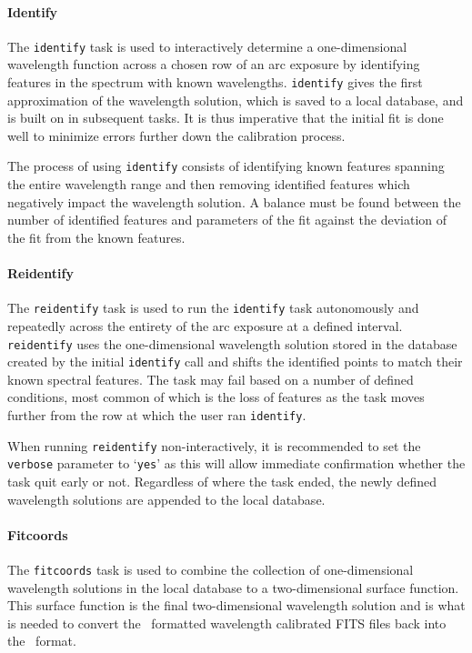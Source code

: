 \paragraph{Identify}
The \texttt{identify} task is used to interactively determine a one-dimensional wavelength function across a chosen row of an arc exposure by identifying features in the spectrum with known wavelengths. \texttt{identify} gives the first approximation of the wavelength solution, which is saved to a local database, and is built on in subsequent tasks. It is thus imperative that the initial fit is done well to minimize errors further down the calibration process.
\prgph

The process of using \texttt{identify} consists of identifying known features spanning the entire wavelength range and then removing identified features which negatively impact the wavelength solution. A balance must be found between the number of identified features and parameters of the fit against the deviation of the fit from the known features. %

\paragraph{Reidentify}
The \texttt{reidentify} task is used to run the \texttt{identify} task autonomously and repeatedly across the entirety of the arc exposure at a defined interval. \texttt{reidentify} uses the one-dimensional wavelength solution stored in the database created by the initial \texttt{identify} call and shifts the identified points to match their known spectral features. The task may fail based on a number of defined conditions, most common of which is the loss of features as the task moves further from the row at which the user ran \texttt{identify}.
\prgph

When running \texttt{reidentify} non-interactively, it is recommended to set the \texttt{verbose} parameter to `\texttt{yes}' as this will allow immediate confirmation whether the task quit early or not. Regardless of where the task ended, the newly defined wavelength solutions are appended to the local database.

\paragraph{Fitcoords}
The \texttt{fitcoords} task is used to combine the collection of one-dimensional wavelength solutions in the local database to a two-dimensional surface function. This surface function is the final two-dimensional wavelength solution and is what is needed to convert the \iraf\ formatted wavelength calibrated \gls{FITS} files back into the \polsalt\ format.
\prgph

